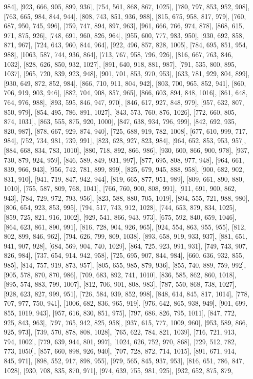 984], [923, 666, 905, 899, 936], [754, 561, 868, 867, 1025], [780, 797, 853, 952, 908], [763, 665, 984, 844, 944], [808, 743, 851, 936, 988], [815, 675, 958, 817, 979], [760, 687, 950, 745, 996], [759, 747, 894, 897, 963], [961, 666, 766, 974, 878], [868, 615, 971, 875, 926], [748, 691, 960, 826, 964], [955, 600, 777, 983, 950], [930, 692, 858, 871, 967], [724, 643, 960, 844, 964], [922, 496, 857, 828, 1005], [784, 695, 851, 954, 988], [1063, 587, 744, 936, 864], [713, 767, 958, 796, 926], [816, 667, 763, 846, 1032], [828, 626, 850, 932, 1027], [891, 640, 918, 881, 987], [791, 535, 800, 895, 1037], [965, 720, 839, 923, 948], [901, 701, 853, 970, 953], [633, 781, 929, 804, 899], [930, 649, 872, 852, 984], [866, 710, 911, 804, 942], [803, 700, 965, 852, 941], [860, 706, 919, 903, 946], [882, 704, 908, 857, 965], [866, 603, 894, 848, 1016], [861, 648, 764, 976, 988], [893, 595, 846, 947, 970], [846, 617, 927, 848, 979], [957, 632, 807, 850, 979], [854, 495, 786, 891, 1027], [843, 573, 760, 876, 1026], [772, 660, 805, 874, 1031], [863, 555, 875, 920, 1000], [847, 638, 934, 796, 999], [842, 692, 935, 820, 987], [878, 667, 929, 874, 940], [725, 688, 919, 782, 1008], [677, 610, 999, 717, 984], [752, 734, 981, 739, 991], [823, 628, 927, 823, 984], [964, 652, 853, 953, 957], [884, 668, 834, 783, 1010], [880, 718, 892, 866, 986], [930, 600, 866, 900, 978], [937, 730, 879, 924, 959], [846, 589, 849, 931, 997], [877, 695, 808, 977, 948], [964, 661, 839, 966, 943], [956, 742, 781, 899, 899], [825, 679, 945, 888, 958], [900, 682, 902, 831, 910], [941, 719, 847, 942, 944], [819, 665, 877, 951, 989], [809, 661, 890, 880, 1010], [755, 587, 809, 768, 1041], [766, 760, 900, 808, 991], [911, 691, 900, 862, 943], [784, 729, 972, 793, 956], [823, 588, 880, 705, 1019], [894, 555, 721, 988, 980], [806, 654, 923, 853, 995], [794, 517, 743, 912, 1028], [744, 653, 879, 834, 1025], [859, 725, 821, 916, 1002], [929, 541, 866, 943, 973], [675, 592, 840, 659, 1046], [864, 623, 861, 890, 991], [816, 728, 904, 926, 965], [924, 554, 863, 955, 955], [812, 802, 899, 846, 962], [794, 626, 799, 809, 1038], [893, 658, 919, 933, 937], [881, 651, 941, 907, 928], [684, 569, 904, 740, 1029], [864, 725, 923, 991, 931], [749, 743, 907, 826, 984], [737, 654, 914, 942, 958], [725, 695, 907, 844, 984], [660, 636, 932, 855, 985], [814, 757, 919, 873, 957], [805, 655, 985, 879, 936], [855, 740, 889, 759, 992], [905, 578, 870, 870, 986], [709, 683, 892, 741, 1010], [836, 585, 862, 860, 1018], [895, 574, 883, 799, 1007], [812, 706, 901, 808, 983], [787, 550, 868, 738, 1027], [928, 623, 827, 999, 951], [726, 584, 939, 852, 998], [848, 614, 845, 817, 1014], [778, 707, 977, 750, 941], [1006, 682, 836, 965, 919], [976, 642, 865, 938, 949], [901, 699, 855, 1019, 943], [957, 616, 830, 851, 975], [797, 686, 826, 795, 1011], [847, 772, 925, 843, 963], [797, 765, 942, 825, 958], [937, 615, 777, 1009, 960], [953, 589, 866, 925, 973], [739, 570, 878, 808, 1028], [765, 622, 784, 821, 1039], [716, 721, 913, 794, 1002], [779, 639, 944, 801, 997], [1024, 626, 752, 970, 868], [729, 512, 782, 773, 1050], [857, 660, 898, 926, 940], [707, 728, 872, 714, 1015], [891, 671, 914, 845, 971], [898, 552, 917, 898, 955], [979, 565, 845, 937, 953], [816, 651, 786, 847, 1028], [930, 708, 835, 870, 971], [974, 639, 755, 981, 925], [932, 652, 875, 879, 